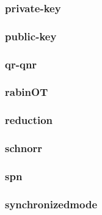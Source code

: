 \begin{frame}\frametitle{private-key}
\begin{figure}
\begin{center}

\end{center}
\end{figure}
\end{frame}
\begin{frame}\frametitle{public-key}
\begin{figure}
\begin{center}

\end{center}
\end{figure}
\end{frame}
\begin{frame}\frametitle{qr-qnr}
\begin{figure}
\begin{center}

\end{center}
\end{figure}
\end{frame}
\begin{frame}\frametitle{rabinOT}
\begin{figure}
\begin{center}

\end{center}
\end{figure}
\end{frame}
\begin{frame}\frametitle{reduction}
\begin{figure}
\begin{center}

\end{center}
\end{figure}
\end{frame}
\begin{frame}\frametitle{schnorr}
\begin{figure}
\begin{center}

\end{center}
\end{figure}
\end{frame}
\begin{frame}\frametitle{spn}
\begin{figure}
\begin{center}

\end{center}
\end{figure}
\end{frame}
\begin{frame}\frametitle{synchronizedmode}
\begin{figure}
\begin{center}

\end{center}
\end{figure}
\end{frame}

